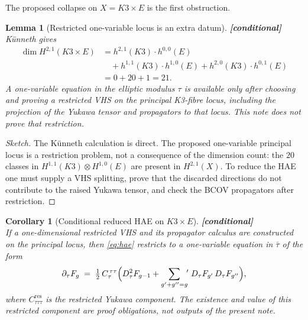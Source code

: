 \documentclass[11pt]{article}
\theoremstyle{plain}
\newtheorem{lemma}[theorem]{Lemma}
\newtheorem{corollary}[theorem]{Corollary}
\theoremstyle{definition}
\theoremstyle{remark}
\providecommand{\ClaimStatusConditional}[1][]{\textbf{[conditional]}}
\begin{document}
\medskip

The proposed collapse on $X = K3\times E$ is the first obstruction.

\begin{lemma}[Restricted one-variable locus is an extra datum]
\label{lem:one-modulus}
\ClaimStatusConditional{}\\
K\"unneth gives
\[
\begin{aligned}
\dim H^{2,1}(K3\times E) &= h^{2,1}(K3)\cdot h^{0,0}(E) \\
&\quad + h^{1,1}(K3)\cdot h^{1,0}(E) + h^{2,0}(K3)\cdot h^{0,1}(E) \\
&=0+20+1=21 .
\end{aligned}
\]
A one-variable equation in the elliptic modulus $\tau$ is available only
after choosing and proving a restricted VHS on the principal
K3-fibre locus, including the projection of the Yukawa tensor and
propagators to that locus. This note does not prove that restriction.
\end{lemma}

\begin{proof}[Sketch]
The K\"unneth calculation is direct. The proposed one-variable
principal locus is a restriction problem, not a consequence of the
dimension count: the $20$ classes in
$H^{1,1}(K3)\otimes H^{1,0}(E)$ are present in $H^{2,1}(X)$. To reduce
the HAE one must supply a VHS splitting, prove that the discarded
directions do not contribute to the raised Yukawa tensor, and check the
BCOV propagators after restriction.
\end{proof}

\begin{corollary}[Conditional reduced HAE on $K3\times E$]
\label{cor:reduced-hae}
\ClaimStatusConditional{}\\
If a one-dimensional restricted VHS and its propagator calculus are
constructed on the principal locus, then \eqref{eq:hae} restricts to a
one-variable equation in $\bar\tau$ of the form
\begin{equation}
\label{eq:hae-1d}
\partial_{\bar\tau} F_g
\;=\; \tfrac{1}{2}\,\overline{C}^{\,\tau\tau}_{\bar\tau}
\Bigl( D_\tau^2 F_{g-1} + \sum_{g'+g''=g}\!\!{}'\;
  D_\tau F_{g'}\, D_\tau F_{g''}\Bigr),
\end{equation}
where $C_{\tau\tau\tau}^{\mathrm{res}}$ is the restricted Yukawa
component. The existence and value of this restricted component are
proof obligations, not outputs of the present note.
\end{corollary}
\end{document}
